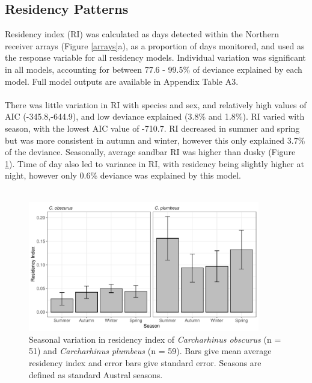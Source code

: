 \documentclass[11pt,a4paper]{article}
\begin{document}
	
	
	
	
	\subsection{Residency Patterns}
	
	Residency index (RI) was calculated as days detected within the Northern receiver arrays (Figure \ref{arrays}a), as a proportion of days monitored, and used as the response variable for all residency models. Individual variation was significant in all models, accounting for between 77.6 - 99.5\% of deviance explained by each model. Full model outputs are available in Appendix Table A3.\\
	\\
	There was little variation in RI with species and sex, and relatively high values of AIC (-345.8,-644.9), and low deviance explained (3.8\% and 1.8\%). RI varied with season, with the lowest AIC value of -710.7. RI decreased in summer and spring but was more consistent in autumn and winter, however this only explained 3.7\% of the deviance. Seasonally, average sandbar RI was higher than dusky (Figure \ref{ri_seasons}). Time of day also led to variance in RI, with residency being slightly higher at night, however only 0.6\% deviance was explained by this model.\\
	\\
	
	\begin{figure}[h!]
		\centering\includegraphics[width=0.9\textwidth]{../Results/ri_season.pdf}
		\caption{Seasonal variation in residency index of \textit{Carcharhinus obscurus} (n = 51) and \textit{Carcharhinus plumbeus} (n = 59). Bars give mean average residency index and error bars give standard error. Seasons are defined as standard Austral seasons.}
		\label{ri_seasons}
	\end{figure}		
	
\end{document}
